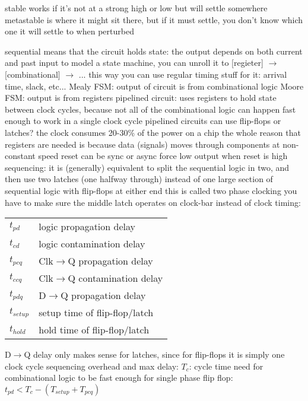 \documentclass[12pt]{article}
\begin{document}
\begin{spacing}{0.8}
\begin{multicols*}{2}
\begin{flushleft}
\begin{outline}[longenum]
  \1 stable works if it's not at a strong high or low but will settle somewhere
  \1 metastable is where it might sit there, but if it must settle, you don't know which one it will settle to when perturbed

  \1 sequential means that the circuit holds state: the output depends on both current and past input
  \1 to model a state machine, you can unroll it to [regieter] $\rightarrow$ [combinational] $\rightarrow$ ...
    \2 this way you can use regular timing stuff for it: arrival time, slack, etc...
  \1 Mealy FSM: output of circuit is from combinational logic
  \1 Moore FSM: output is from registers
  \1 pipelined circuit: uses registers to hold state between clock cycles, because not all of the combinational logic can happen fast enough to work in a single clock cycle
    \2 pipelined circuits can use flip-flops or latches?
  \1 the clock consumes 20-30\% of the power on a chip
  \1 the whole reason that registers are needed is because data (signals) moves through components at non-constant speed
  \1 reset
    \2 can be sync or async
    \2 force low output when reset is high
  \1 sequencing: it is (generally) equivalent to split the sequential logic in two, and then use two latches (one halfway through) instead of one large section of sequential logic with flip-flops at either end
    \2 this is called two phase clocking
    \2 you have to make sure the middle latch operates on clock-bar instead of clock
  \1 timing: \\
  \begin{tabular}{l l}
    $t_{pd}$ & logic propagation delay \\
    $t_{cd}$ & logic contamination delay \\
    $t_{pcq}$ & Clk$\rightarrow$Q propagation delay \\
    $t_{ccq}$ & Clk$\rightarrow$Q contamination delay \\
    $t_{pdq}$ & D$\rightarrow$Q propagation delay \\
    $t_{setup}$ & setup time of flip-flop/latch \\
    $t_{hold}$ & hold time of flip-flop/latch\\
  \end{tabular}
    \2 D$\rightarrow$Q delay only makes sense for latches, since for flip-flops it is simply one clock cycle
  \1 sequencing overhead and max delay:
    \2 $T_c$: cycle time
    \2 need for combinational logic to be fast enough
    \2 for single phase flip flop: $t_{pd} < T_c - (T_{setup} + T_{pcq})$

\end{outline}
\end{flushleft}
\end{multicols*}
\end{spacing}
\end{document}
